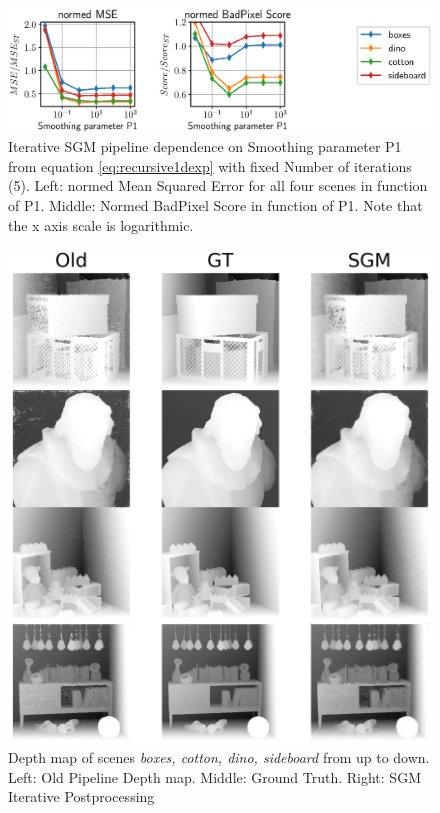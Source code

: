\documentclass  [
  paper    = a4,
  BCOR     = 10mm,
  twoside,
  fontsize = 12pt,
  fleqn,
  toc      = bibnumbered,
  toc      = listofnumbered,
  numbers  = noendperiod,
  headings = normal,
  listof   = leveldown,
  version  = 3.03
]                                       {scrreprt}
\begin{document}
\begin{figure}
	\centering
	\includegraphics[width=1\linewidth]{images/choose_lower_sgm_ppr_merge_iterations_exp_penalty1}
	\caption[Iterative SGM dependence on Smoothing Parameter ]{Iterative SGM pipeline dependence on Smoothing parameter P1 from equation \ref{eq:recursive1dexp} with fixed Number of iterations (5). Left: normed Mean Squared Error for all four scenes in function of P1. Middle: Normed BadPixel Score in function of P1. Note that the x axis scale is logarithmic.}
	\label{fig:chooselowersgmpprmergeiterationsexppenalty1}
\end{figure}


\begin{figure}
	\centering
	\includegraphics[width=1\linewidth]{images/sgm_results_iterative}
	\caption[Iterative SGM Images]{Depth map of scenes \textit{boxes, cotton, dino, sideboard} from up to down. Left: Old Pipeline Depth map. Middle: Ground Truth. Right: SGM Iterative Postprocessing}
	\label{fig:sgmresultsiterative}
\end{figure}
\end{document}
